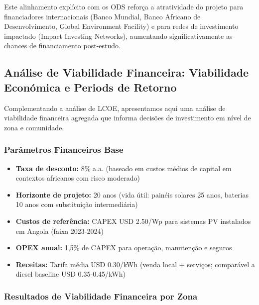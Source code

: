 \documentclass[12pt, a4paper]{article}
\begin{document}
Este alinhamento explícito com os ODS reforça a atratividade do projeto para financiadores internacionais (Banco Mundial, Banco Africano de Desenvolvimento, Global Environment Facility) e para redes de investimento impactado (Impact Investing Networks), aumentando significativamente as chances de financiamento post-estudo.

\subsection{Análise de Viabilidade Financeira: Viabilidade Económica e Periods de Retorno}

Complementando a análise de LCOE, apresentamos aqui uma análise de viabilidade financeira agregada que informa decisões de investimento em nível de zona e comunidade.

\subsubsection{Parâmetros Financeiros Base}

\begin{itemize}
    \item \textbf{Taxa de desconto:} 8\% a.a. (baseado em custos médios de capital em contextos africanos com risco moderado)
    \item \textbf{Horizonte de projeto:} 20 anos (vida útil: painéis solares 25 anos, baterias 10 anos com substituição intermediária)
    \item \textbf{Custos de referência:} CAPEX USD 2.50/Wp para sistemas PV instalados em Angola (faixa 2023-2024)
    \item \textbf{OPEX anual:} 1,5\% de CAPEX para operação, manutenção e seguros
    \item \textbf{Receitas:} Tarifa média USD 0.30/kWh (venda local + serviços; comparável a diesel baseline USD 0.35-0.45/kWh)
\end{itemize}

\subsubsection{Resultados de Viabilidade Financeira por Zona}
\end{document}
